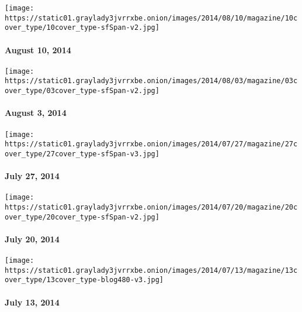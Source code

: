 \href{http://www.nytimes3xbfgragh.onion/indexes/2014/08/10/magazine/index.html}{}

\texttt{[image: https://static01.graylady3jvrrxbe.onion/images/2014/08/10/magazine/10cover\_type/10cover\_type-sfSpan-v2.jpg]}

\hypertarget{august-10-2014}{%
\paragraph{August 10, 2014}\label{august-10-2014}}

\href{http://www.nytimes3xbfgragh.onion/indexes/2014/08/03/magazine/index.html}{}

\texttt{[image: https://static01.graylady3jvrrxbe.onion/images/2014/08/03/magazine/03cover\_type/03cover\_type-sfSpan-v2.jpg]}

\hypertarget{august-3-2014}{%
\paragraph{August 3, 2014}\label{august-3-2014}}

\href{http://www.nytimes3xbfgragh.onion/indexes/2014/07/27/magazine/index.html}{}

\texttt{[image: https://static01.graylady3jvrrxbe.onion/images/2014/07/27/magazine/27cover\_type/27cover\_type-sfSpan-v3.jpg]}

\hypertarget{july-27-2014}{%
\paragraph{July 27, 2014}\label{july-27-2014}}

\href{http://www.nytimes3xbfgragh.onion/indexes/2014/07/20/magazine/index.html}{}

\texttt{[image: https://static01.graylady3jvrrxbe.onion/images/2014/07/20/magazine/20cover\_type/20cover\_type-sfSpan-v2.jpg]}

\hypertarget{july-20-2014}{%
\paragraph{July 20, 2014}\label{july-20-2014}}

\href{http://www.nytimes3xbfgragh.onion/indexes/2014/07/13/magazine/index.html}{}

\texttt{[image: https://static01.graylady3jvrrxbe.onion/images/2014/07/13/magazine/13cover\_type/13cover\_type-blog480-v3.jpg]}

\hypertarget{july-13-2014}{%
\paragraph{July 13, 2014}\label{july-13-2014}}

